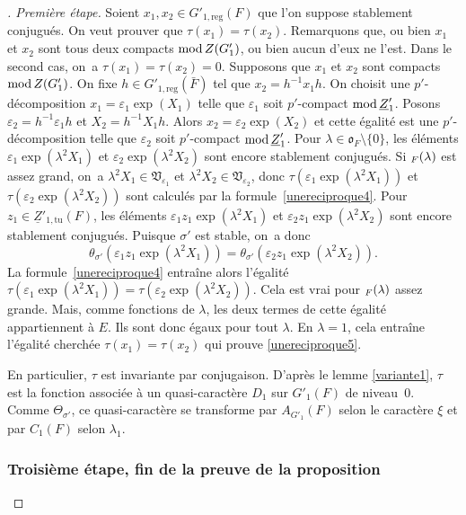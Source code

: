 \documentclass[JEP,XML,SOM,Unicode,francais]{cedram}
\newcommand{\NoChangel}[1]{%
\expandafter\let\csname old\string#1\endcsname=#1
\let#1=\relax
\newcommand{#1}{\mathcode`l="716C\csname old\string#1\endcsname\mathcode`l="7160 }%
}
\let\epsilon\varepsilon
\newcommand{\rmod}{\textup{mod}\,}
\newcommand{\fro}{\mathfrak{o}}
\newcommand{\frV}{\mathfrak{V}}
\newcommand{\reg}{\mathrm{reg}}
\newcommand{\tu}{\mathrm{tu}}
\DeclareMathOperator{\val}{val} \NoChangel{\val}
\theoremstyle{plain}
\theoremstyle{definition}
\begin{document}
\begin{proof}[\proofname. Première étape]
Soient $x_{1},x_{2}\in G'_{1,\reg}(F)$ que l'on suppose stablement conjugués. On veut prouver que $\tau(x_{1})=\tau(x_{2})$. Remarquons que, ou bien $x_{1}$ et $x_{2}$ sont tous deux compacts $\rmod Z(G'_{1})$, ou bien aucun d'eux ne l'est. Dans le second cas, on~a \hbox{$\tau(x_{1})=\tau(x_{2})=0$}. Supposons que $x_{1}$ et $x_{2}$ sont compacts $\rmod Z(G'_{1})$. On fixe $h\in G'_{1,\reg}(\bar{F})$ tel que $x_{2}=h^{-1}x_{1}h$. On choisit une $p'$-décomposition $x_{1}=\epsilon_{1}\exp(X_{1})$ telle que $\epsilon_{1}$ soit $p'$-compact $\rmod \underline{Z}'_{1}$. Posons $\epsilon_{2}=h^{-1}\epsilon_{1}h$ et $X_{2}=h^{-1}X_{1}h$. Alors $x_{2}=\epsilon_{2}\exp(X_{2})$ et cette égalité est une $p'$-décomposition telle que $\epsilon_{2}$ soit $p'$-compact $\rmod \underline{Z}'_{1}$. Pour \hbox{$\lambda\in \fro_{F}\setminus\{0\}$}, les éléments $\epsilon_{1}\exp(\lambda^2X_{1})$ et $\epsilon_{2}\exp(\lambda^2X_{2})$ sont encore stablement conjugués. Si $\val_{F}(\lambda)$ est assez grand, on~a $\lambda^2X_{1}\in \frV_{\epsilon_{1}}$ et $\lambda^2X_{2}\in \frV_{\epsilon_{2}}$, donc $\tau(\epsilon_{1}\exp(\lambda^2X_{1}))$ et $\tau(\epsilon_{2}\exp(\lambda^2X_{2}))$ sont calculés par la formule~\eqref{unereciproque4}. Pour $z_{1}\in \underline{Z}'_{1,\tu}(F)$, les éléments $\epsilon_{1}z_{1}\exp(\lambda^2X_{1})$ et $\epsilon_{2}z_{1}\exp(\lambda^2X_{2})$ sont encore stablement conjugués. Puisque $\sigma'$ est stable, on~a donc
\[
\theta_{\sigma'}(\epsilon_{1}z_{1}\exp(\lambda^2X_{1}))=\theta_{\sigma'}(\epsilon_{2}z_{1}\exp(\lambda^2X_{2})).
\]
La formule~\eqref{unereciproque4} entraîne alors l'égalité $\tau(\epsilon_{1}\exp(\lambda^2X_{1}))=\tau(\epsilon_{2}\exp(\lambda^2X_{2}))$. Cela est vrai pour $\val_{F}(\lambda)$ assez grande. Mais, comme fonctions de $\lambda$, les deux termes de cette égalité appartiennent à $E$. Ils sont donc égaux pour tout $\lambda$. En $\lambda=1$, cela entraîne l'égalité cherchée $\tau(x_{1})=\tau(x_{2})$ qui prouve \eqref{unereciproque5}.

En particulier, $\tau$
est invariante par conjugaison. D'après le lemme \ref{variante1}, $\tau$ est la fonction associée à un quasi-caractère $D_{1}$ sur $G'_{1}(F)$ de niveau~$0$. Comme $\Theta_{\sigma'}$, ce quasi-caractère se transforme par $A_{G'_{1}}(F)$ selon le caractère $\xi$ et par $C_{1}(F)$ selon $\lambda_{1}$.

\subsubsection*{Troisième étape, fin de la preuve de la proposition}


\end{proof}
\end{document}
